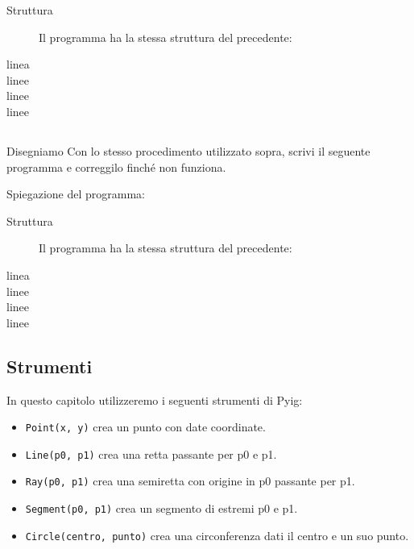 \begin{description}
 \item [Struttura] 
 Il programma ha la stessa struttura del precedente:
 \item [linea ]
 
 \item [linee ]
 
 \item [linee ]
 \item [linee ]
\end{description}

\begin{osservazione}

 

\end{osservazione}

\subsection{}
\label{subsec:geo_int_}
Disegniamo 
Con lo stesso procedimento utilizzato sopra, scrivi il seguente programma e 
correggilo finché non funziona.



Spiegazione del programma:

\begin{description}
 \item [Struttura] 
 Il programma ha la stessa struttura del precedente:
 \item [linea ]
 
 \item [linee ]
 
 \item [linee ]
 \item [linee ]
\end{description}

\begin{osservazione}

 

\end{osservazione}


\subsection{Strumenti}

In questo capitolo utilizzeremo i seguenti strumenti di Pyig:
\begin{itemize} [noitemsep]
\item \texttt{Point(x, y)} crea un punto con date coordinate.
\item \texttt{Line(p0, p1)} crea una retta passante per p0 e p1.
\item \texttt{Ray(p0, p1)} crea una semiretta con origine in p0 passante per p1.
\item \texttt{Segment(p0, p1)} crea un segmento di estremi p0 e p1.
\item \texttt{Circle(centro, punto)} crea una circonferenza dati il centro e 
un suo punto.

\end{itemize}


